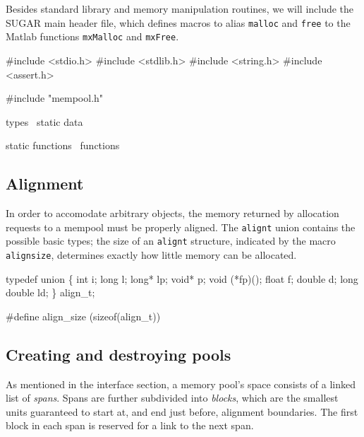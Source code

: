 Besides standard library and memory manipulation routines,
we will include the SUGAR main header file, which defines
macros to alias {\tt{}malloc} and {\tt{}free} to the Matlab
functions {\tt{}mxMalloc} and {\tt{}mxFree}.

\nwenddocs{}\endmoddef
#include <stdio.h>
#include <stdlib.h>
#include <string.h>
#include <assert.h>

#include "mempool.h"

\LA{}types~{\nwtagstyle{}}\RA{}
\LA{}static data~{\nwtagstyle{}}\RA{}

\LA{}static functions~{\nwtagstyle{}}\RA{}
\LA{}functions~{\nwtagstyle{}}\RA{}
\nwendcode{}\nwdocspar


\subsection{Alignment}

In order to accomodate arbitrary objects, the memory returned
by allocation requests to a mempool must be properly aligned.
The {\tt{}align{}t} union contains the possible basic types;
the size of an {\tt{}align{}t} structure, indicated by the macro
{\tt{}align{}size}, determines exactly how little memory can be
allocated.

\nwenddocs{}\endmoddef
typedef union \{
    int i;
    long l;
    long* lp;
    void* p;
    void (*fp)();
    float f;
    double d;
    long double ld;
\} align_t;

#define align_size (sizeof(align_t))

\nwendcode{}\nwdocspar


\subsection{Creating and destroying pools}

As mentioned in the interface section, a memory pool's space
consists of a linked list of \emph{spans}.  Spans are further
subdivided into \emph{blocks}, which are the smallest units
guaranteed to start at, and end just before, alignment boundaries.
The first block in each span is reserved for a link to
the next span.


